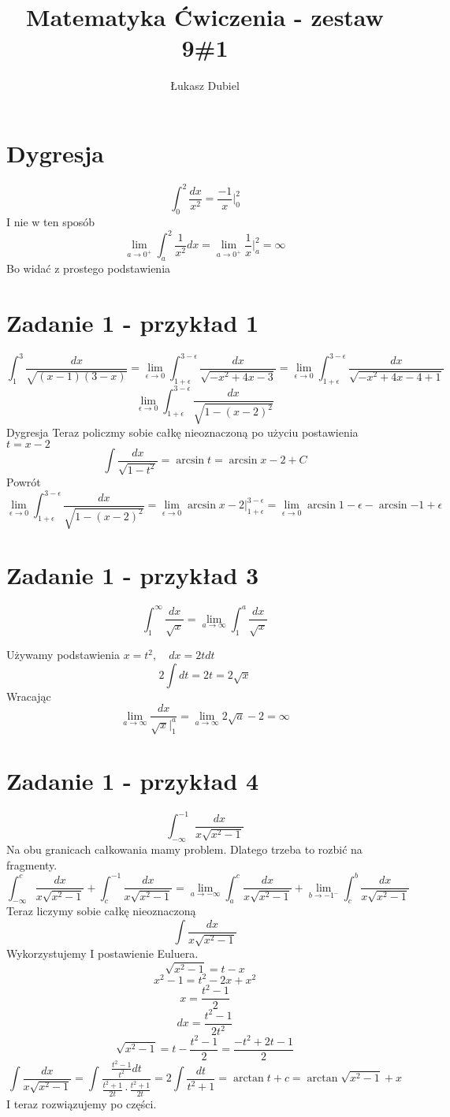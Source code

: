 \documentclass[11pt]{article}
\author{Łukasz Dubiel}
\title{Matematyka Ćwiczenia - zestaw 9\#1}
\begin{document}
\maketitle

\section{Dygresja}
$$ \int_0^2 \frac{dx}{x^2} = \frac{-1}{x} |_0^2 $$
I nie w ten sposób
$$ \lim_{a \to 0^+}{\int_a^2 \frac{1}{x^2}dx} = \lim_{a \to 0^+}{\frac{1}{x}|_a^2 = \infty} $$
Bo widać z prostego podstawienia
\section{Zadanie 1 - przykład 1}
$$ \int_1^3 \frac{dx}{\sqrt{(x-1)(3-x)}} = \lim_{\epsilon \to 0} \int_{1+\epsilon}^{3-\epsilon} \frac{dx}{\sqrt{-x^2 + 4x -3 }} = \lim_{\epsilon \to 0} \int_{1+\epsilon}^{3-\epsilon} \frac{dx}{\sqrt{-x^2 + 4x - 4 + 1 }} $$
$$ \lim_{\epsilon \to 0} \int_{1+\epsilon}^{3-\epsilon} \frac{dx}{\sqrt{1 - (x-2)^2}}  $$
Dygresja
Teraz policzmy sobie całkę nieoznaczoną po użyciu postawienia $ t = x -2 $
$$ \int \frac{dx}{\sqrt{1-t^2}} = \arcsin{t} = \arcsin{x-2} + C $$
Powrót
$$ \lim_{\epsilon \to 0} \int_{1+\epsilon}^{3-\epsilon} \frac{dx}{\sqrt{1 - (x-2)^2}}  = \lim_{\epsilon \to 0}{\arcsin{x-2}|_{1+\epsilon}^{3-\epsilon} } = \lim_{\epsilon \to 0}{\arcsin{1-\epsilon} - \arcsin{-1+\epsilon}}$$

\section{Zadanie 1 - przykład 3}
$$ \int_1^{\infty} \frac{dx}{\sqrt{x}} = \lim_{a \to \infty}{ \int_1^a \frac{dx}{\sqrt{x}} }$$

Używamy podstawienia $ x = t^2, \quad dx = 2tdt $
$$2 \int dt = 2t = 2\sqrt{x} $$
Wracając
$$ \lim_{a \to \infty}{ \frac{dx}{\sqrt{x} |_1^a}} = 
\lim_{a \to \infty}{ 2\sqrt{a} - 2 = \infty}$$

\section{Zadanie 1 - przykład 4}
$$ \int_{-\infty}^{-1} \frac{dx}{x\sqrt{x^2-1}} $$
Na obu granicach całkowania mamy problem. Dlatego trzeba to rozbić na fragmenty.
$$ \int_{-\infty}^{c} \frac{dx}{x\sqrt{x^2-1}} + \int_{c}^{-1} \frac{dx}{x\sqrt{x^2-1}} = \lim_{a \to -\infty}{\int_{a}^{c} \frac{dx}{x\sqrt{x^2-1}}} + \lim_{b \to -1^-}{\int_{c}^{b} \frac{dx}{x\sqrt{x^2-1}}}$$
Teraz liczymy sobie całkę nieoznaczoną
$$ \int \frac{dx}{x\sqrt{x^2-1}} $$
Wykorzystujemy I postawienie Euluera. 
$$ \sqrt{x^2-1} = t - x$$
$$ x^2 -1 = t^2 - 2x + x^2$$
$$ x = \frac{t^2-1}{2}$$
$$ dx = \frac{t^2-1}{2t^2} $$
$$ \sqrt{x^2-1} = t - \frac{t^2-1}{2} = \frac{-t^2 +2t -1}{2} $$
$$ \int \frac{dx}{x\sqrt{x^2-1}} = \int \frac{\frac{t^2-1}{t^2}dt}{\frac{t^2+1}{2t} \cdot \frac{t^2+1}{2t} } = 2 \int \frac{dt}{t^2+1} = \arctan{t} + c = \arctan{\sqrt{x^2-1}+x} $$
I teraz rozwiązujemy po części.
\end{document}
